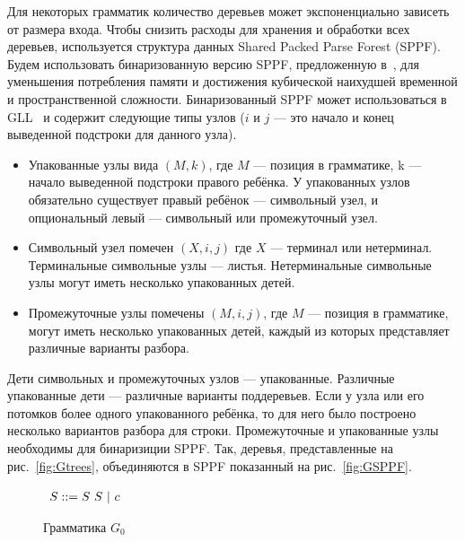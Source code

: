 \documentclass[14pt]{matmex-diploma-custom}
\begin{document}
    Для некоторых грамматик количество деревьев может экспоненциально зависеть от размера входа.
    Чтобы снизить расходы для хранения и обработки всех деревьев, используется структура данных
    Shared Packed Parse Forest (SPPF). 
    Будем использовать бинаризованную версию SPPF, предложенную в~\cite{brnglr}, для уменьшения
    потребления памяти и достижения кубической наихудшей временной и пространственной сложности.
    Бинаризованный SPPF может использоваться в GLL~\cite{scott2013gll} и содержит следующие типы узлов
    ($i$ и $j$ --- это начало и конец выведенной подстроки для данного узла).
    \begin{itemize}
        \item Упакованные узлы вида $(M, k)$, где $M$ --- позиция в грамматике, k --- начало выведенной
        подстроки правого ребёнка. У упакованных узлов обязательно существует правый ребёнок ---
        символьный узел, и опциональный левый --- символьный или промежуточный узел.
        \item Символьный узел помечен $(X, i, j)$ где $X$ --- терминал или нетерминал.
        Терминальные символьные узлы --- листья. 
        Нетерминальные символьные узлы могут иметь несколько упакованных детей. 
        \item Промежуточные узлы помечены $ (M, i, j) $, где $M$ --- позиция в грамматике, 
        могут иметь несколько упакованных детей, каждый из которых представляет различные варианты разбора.
    \end{itemize}
    Дети символьных и промежуточных узлов --- упакованные. Различные упакованные дети --- различные варианты поддеревьев.
    Если у узла или его потомков более одного упакованного ребёнка, то для него было построено несколько вариантов 
    разбора для строки. Промежуточные и упакованные узлы необходимы для бинаризиции SPPF.
    Так, деревья, представленные на рис.~\ref{fig:Gtrees}, объединяются в SPPF показанный на рис.~\ref{fig:GSPPF}.
    \begin{figure}
        \centering
        $
        \begin{array}[b]{rl}
        S ::= S\ S\ | \ c \ \ \ 
        \end{array}
        $
        \caption{Грамматика $G_0$}
        \label{fig:fig0}
    \end{figure}
\end{document}
